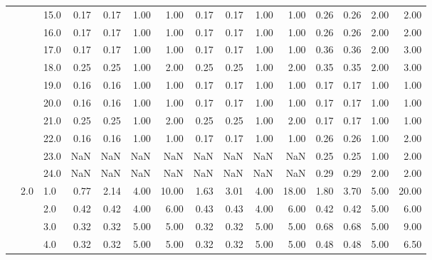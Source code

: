 \begin{tabular}{lllrrrrrrrrrrrr}
       &     & 15.0 &       0.17 &      0.17 & 1.00 &   1.00 &       0.17 &      0.17 &  1.00 &   1.00 &       0.26 &      0.26 &  2.00 &   2.00 \\
       &     & 16.0 &       0.17 &      0.17 & 1.00 &   1.00 &       0.17 &      0.17 &  1.00 &   1.00 &       0.26 &      0.26 &  2.00 &   2.00 \\
       &     & 17.0 &       0.17 &      0.17 & 1.00 &   1.00 &       0.17 &      0.17 &  1.00 &   1.00 &       0.36 &      0.36 &  2.00 &   3.00 \\
       &     & 18.0 &       0.25 &      0.25 & 1.00 &   2.00 &       0.25 &      0.25 &  1.00 &   2.00 &       0.35 &      0.35 &  2.00 &   3.00 \\
       &     & 19.0 &       0.16 &      0.16 & 1.00 &   1.00 &       0.17 &      0.17 &  1.00 &   1.00 &       0.17 &      0.17 &  1.00 &   1.00 \\
       &     & 20.0 &       0.16 &      0.16 & 1.00 &   1.00 &       0.17 &      0.17 &  1.00 &   1.00 &       0.17 &      0.17 &  1.00 &   1.00 \\
       &     & 21.0 &       0.25 &      0.25 & 1.00 &   2.00 &       0.25 &      0.25 &  1.00 &   2.00 &       0.17 &      0.17 &  1.00 &   1.00 \\
       &     & 22.0 &       0.16 &      0.16 & 1.00 &   1.00 &       0.17 &      0.17 &  1.00 &   1.00 &       0.26 &      0.26 &  1.00 &   2.00 \\
       &     & 23.0 &        NaN &       NaN &  NaN &    NaN &        NaN &       NaN &   NaN &    NaN &       0.25 &      0.25 &  1.00 &   2.00 \\
       &     & 24.0 &        NaN &       NaN &  NaN &    NaN &        NaN &       NaN &   NaN &    NaN &       0.29 &      0.29 &  2.00 &   2.00 \\
       & 2.0 & 1.0  &       0.77 &      2.14 & 4.00 &  10.00 &       1.63 &      3.01 &  4.00 &  18.00 &       1.80 &      3.70 &  5.00 &  20.00 \\
       &     & 2.0  &       0.42 &      0.42 & 4.00 &   6.00 &       0.43 &      0.43 &  4.00 &   6.00 &       0.42 &      0.42 &  5.00 &   6.00 \\
       &     & 3.0  &       0.32 &      0.32 & 5.00 &   5.00 &       0.32 &      0.32 &  5.00 &   5.00 &       0.68 &      0.68 &  5.00 &   9.00 \\
       &     & 4.0  &       0.32 &      0.32 & 5.00 &   5.00 &       0.32 &      0.32 &  5.00 &   5.00 &       0.48 &      0.48 &  5.00 &   6.50 \\

\end{tabular}
